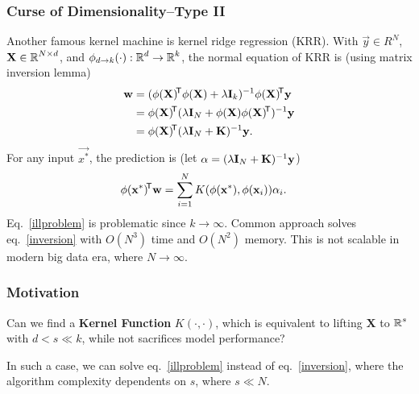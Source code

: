 \documentclass[10pt]{../Formats/RU}
\begin{document}
\begin{frame}
  \frametitle{Curse of Dimensionality--Type II}
  Another famous kernel machine is kernel ridge regression (KRR). With $\vec{y}\in R^N$, $\mathbf{X}\in\operatorname{\mathbb{R}}^{N\times d}$, and $\phi_{d\rightarrow k}(\cdot):\operatorname{\mathbb{R}}^d\rightarrow\operatorname{\mathbb{R}}^k$,
  the normal equation of KRR is (using matrix inversion lemma)
  \begin{align}
    \mathbf{w} &= (\phi(\mathbf{X})\!^{\mathsf{T}}\phi(\mathbf{X})+\lambda\mathbf{I}_k)^{-1}\phi(\mathbf{X})\!^{\mathsf{T}}\mathbf{y} \label{illproblem} \\
    &= \phi(\mathbf{X})\!^{\mathsf{T}}(\lambda\mathbf{I}_N+\phi(\mathbf{X})\phi(\mathbf{X})\!^{\mathsf{T}})^{-1}\mathbf{y} \label{inversion}\\
    &= \phi(\mathbf{X})\!^{\mathsf{T}}(\lambda\mathbf{I}_N+\mathbf{K})^{-1}\mathbf{y}.
  \end{align}
  For any input $\vec{x^*}$, the prediction is (let $\mathbf{\alpha}=(\lambda\mathbf{I}_N+\mathbf{K})^{-1}\mathbf{y}$)
  \begin{align}
    \phi(\mathbf{x^*})\!^{\mathsf{T}}\mathbf{w}
    &= \sum_{i=1}^{N}K(\phi(\mathbf{x^*}), \phi(\mathbf{x}_i))\mathbf{\alpha}_i.
  \end{align}
  Eq.~\eqref{illproblem} is problematic since $k\rightarrow\infty$. Common approach solves eq.~\eqref{inversion} with $O(N^3)$ time and $O(N^2)$ memory. This is not scalable in modern big data era, where $N\rightarrow\infty$.
\end{frame}
\begin{frame}
  \frametitle{Motivation}
  Can we find a \textbf{Kernel Function} $K(\cdot, \cdot)$, which is equivalent to lifting $\mathbf{X}$ to $\operatorname{\mathbb{R}}^s$ with $d < s\ll k$, while not sacrifices model performance?

  In such a case, we can solve eq.~\eqref{illproblem} instead of eq.~\eqref{inversion}, where the algorithm complexity dependents on $s$, where $s\ll N$.
\end{frame}
\end{document}
